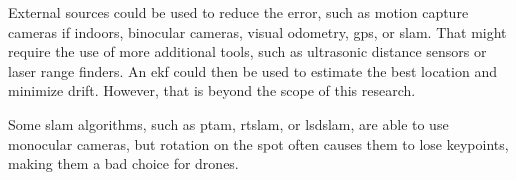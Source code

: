   External sources could be used to reduce the error, such as motion capture cameras if indoors, binocular cameras, visual odometry, \gls{gps}, or \gls{slam}.
  That might require the use of more additional tools, such as ultrasonic distance sensors or laser range finders.
  An \gls{ekf} could then be used to estimate the best location and minimize drift.
  However, that is beyond the scope of this research.

  Some \gls{slam} algorithms, such as \gls{ptam}, \gls{rtslam}, or \gls{lsdslam}, are able to use monocular cameras, but rotation on the spot often causes them to lose keypoints, making them a bad choice for drones.

% 
